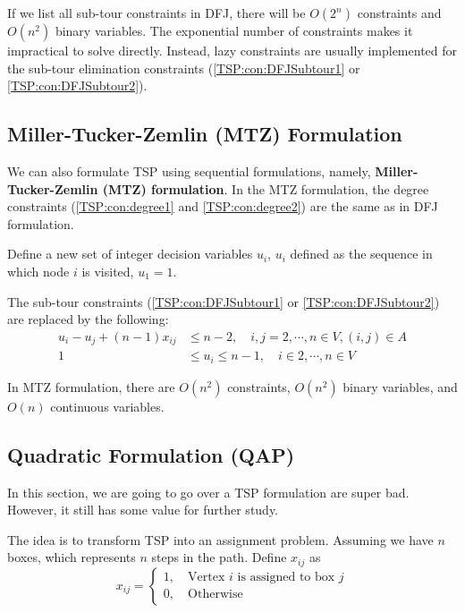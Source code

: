 					If we list all sub-tour constraints in DFJ, there will be $O(2^n)$ constraints and $O(n^2)$ binary variables. The exponential number of constraints makes it impractical to solve directly. Instead, lazy constraints are usually implemented for the sub-tour elimination constraints (\ref{TSP:con:DFJSubtour1} or \ref{TSP:con:DFJSubtour2}).

				\subsection{Miller-Tucker-Zemlin (MTZ) Formulation}
					We can also formulate TSP using sequential formulations, namely, \textbf{Miller-Tucker-Zemlin (MTZ) formulation}. In the MTZ formulation, the degree constraints (\ref{TSP:con:degree1} and \ref{TSP:con:degree2}) are the same as in DFJ formulation.

					Define a new set of integer decision variables $u_i$, $u_i$ defined as the sequence in which node $i$ is visited, $u_1 = 1$.

					The sub-tour constraints (\ref{TSP:con:DFJSubtour1} or \ref{TSP:con:DFJSubtour2}) are replaced by the following:
					\begin{align}
						u_i - u_j + (n - 1) x_{ij} &\le n - 2, \quad i, j = 2, \cdots, n \in V, (i, j) \in A \label{TSP:con:MTZ1}\\
						1 & \le u_i \le n - 1, \quad i \in 2, \cdots, n \in V \label{TSP:con:MTZ2}
					\end{align}

					In MTZ formulation, there are $O(n^2)$ constraints, $O(n^2)$ binary variables, and $O(n)$ continuous variables.

				\subsection{Quadratic Formulation (QAP)}
					In this section, we are going to go over a TSP formulation are super bad. However, it still has some value for further study.

					The idea is to transform TSP into an assignment problem. Assuming we have $n$ boxes, which represents $n$ steps in the path. Define $x_{ij}$ as 
					\begin{equation}
						x_{ij} = \begin{cases}
									1, \quad \text{Vertex $i$ is assigned to box $j$}\\
									0, \quad \text{Otherwise}
								\end{cases}
					\end{equation}

